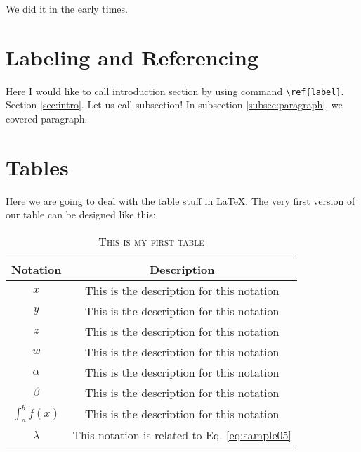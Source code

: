 \documentclass{article}
\begin{document}
We did it in the early times. 



\section{Labeling and Referencing}

Here I would like to call introduction section by using command \verb|\ref{label}|. Section \ref{sec:intro}. Let us call subsection! In subsection \ref{subsec:paragraph}, we covered paragraph.





\section{Tables}
Here we are going to deal with the table stuff in \LaTeX. The very first version of our table can be designed like this: 

\begin{table}[t]
	\centering
	\label{tab:myfirstab}
\begin{tabular}{| c | c |}
	\hline
	\textbf{Notation} & \textbf{Description} \\ \hline
		$x$ & This is the description for this notation \\ \hline
		$y$ & This is the description for this notation \\ \hline
		$z$ & This is the description for this notation \\ \hline
		$w$ & This is the description for this notation \\ \hline
		$\alpha$ & This is the description for this notation \\ \hline
		$\beta$ & This is the description for this notation \\ \hline
		$\int_{a}^{b} f(x)$  & This is the description for this notation \\ \hline
		$\lambda$ & This notation is related to Eq. \ref{eq:sample05} \\ \hline
\end{tabular}
\caption{\textsc{This is my first table}}	
\end{table}


%
\end{document}
